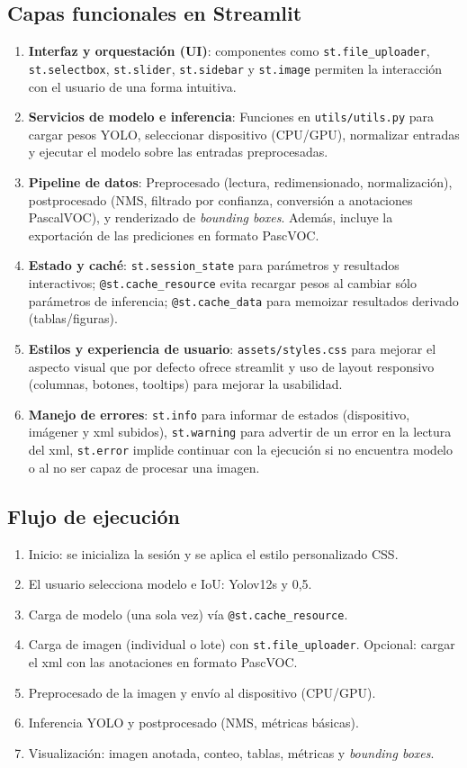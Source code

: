 \documentclass[12pt,a4paper,onecolumn,oneside]{report}
\begin{document}
\subsection{Capas funcionales en Streamlit}
\begin{enumerate}
  \item \textbf{Interfaz y orquestación (UI)}: componentes como \texttt{st.file\_uploader}, \texttt{st.selectbox}, \texttt{st.slider}, \texttt{st.sidebar} y \texttt{st.image} permiten la interacción con el usuario de una forma intuitiva.
  \item \textbf{Servicios de modelo e inferencia}: Funciones en \texttt{utils/utils.py} para cargar pesos YOLO, seleccionar dispositivo (CPU/GPU), normalizar entradas y ejecutar el modelo sobre las entradas preprocesadas.
  \item \textbf{Pipeline de datos}: Preprocesado (lectura, redimensionado, normalización), postprocesado (NMS, filtrado por confianza, conversión a anotaciones PascalVOC), y renderizado de \textit{bounding boxes}. 
  Además, incluye la exportación de las prediciones en formato PascVOC. 
  \item \textbf{Estado y caché}: \texttt{st.session\_state} para parámetros y resultados interactivos; \texttt{@st.cache\_resource} evita recargar 
  pesos al cambiar sólo parámetros de inferencia; \texttt{@st.cache\_data} para memoizar resultados derivado (tablas/figuras).
  \item \textbf{Estilos y experiencia de usuario}: \texttt{assets/styles.css} para mejorar el aspecto visual que por defecto ofrece streamlit y uso de layout 
  responsivo (columnas, botones, tooltips) para mejorar la usabilidad.
  \item \textbf{Manejo de errores}: \texttt{st.info} para informar de estados (dispositivo, imágener y xml subidos), \texttt{st.warning} para advertir de un error en la lectura del xml, 
  \texttt{st.error} implide continuar con la ejecución si no encuentra modelo o al no ser capaz de procesar una imagen.
\end{enumerate}

\subsection{Flujo de ejecución}
\begin{enumerate}
  \item Inicio: se inicializa la sesión y se aplica el estilo personalizado CSS.
  \item El usuario selecciona modelo e IoU: Yolov12s y 0,5.
  \item Carga de modelo (una sola vez) vía \texttt{@st.cache\_resource}.
  \item Carga de imagen (individual o lote) con \texttt{st.file\_uploader}. Opcional: cargar el xml con las anotaciones en formato PascVOC.
  \item Preprocesado de la imagen y envío al dispositivo (CPU/GPU).
  \item Inferencia YOLO y postprocesado (NMS, métricas básicas).
  \item Visualización: imagen anotada, conteo, tablas, métricas y \textit{bounding boxes}.
\end{enumerate}
\end{document}
